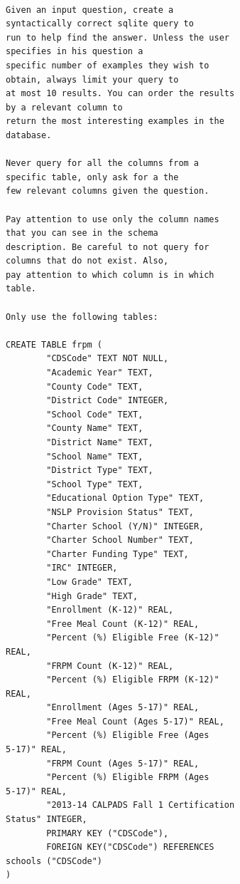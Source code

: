 \documentclass[
  letterpaper,
  DIV=11,
  numbers=noendperiod]{scrartcl}
\begin{document}
\begin{verbatim}

Given an input question, create a 
syntactically correct sqlite query to
run to help find the answer. Unless the user 
specifies in his question a
specific number of examples they wish to 
obtain, always limit your query to
at most 10 results. You can order the results
by a relevant column to
return the most interesting examples in the 
database.

Never query for all the columns from a 
specific table, only ask for a the
few relevant columns given the question.

Pay attention to use only the column names 
that you can see in the schema
description. Be careful to not query for 
columns that do not exist. Also,
pay attention to which column is in which 
table.

Only use the following tables:

CREATE TABLE frpm (
        "CDSCode" TEXT NOT NULL, 
        "Academic Year" TEXT, 
        "County Code" TEXT, 
        "District Code" INTEGER, 
        "School Code" TEXT, 
        "County Name" TEXT, 
        "District Name" TEXT, 
        "School Name" TEXT, 
        "District Type" TEXT, 
        "School Type" TEXT, 
        "Educational Option Type" TEXT, 
        "NSLP Provision Status" TEXT, 
        "Charter School (Y/N)" INTEGER, 
        "Charter School Number" TEXT, 
        "Charter Funding Type" TEXT, 
        "IRC" INTEGER, 
        "Low Grade" TEXT, 
        "High Grade" TEXT, 
        "Enrollment (K-12)" REAL, 
        "Free Meal Count (K-12)" REAL, 
        "Percent (%) Eligible Free (K-12)" 
REAL, 
        "FRPM Count (K-12)" REAL, 
        "Percent (%) Eligible FRPM (K-12)" 
REAL, 
        "Enrollment (Ages 5-17)" REAL, 
        "Free Meal Count (Ages 5-17)" REAL, 
        "Percent (%) Eligible Free (Ages 
5-17)" REAL, 
        "FRPM Count (Ages 5-17)" REAL, 
        "Percent (%) Eligible FRPM (Ages 
5-17)" REAL, 
        "2013-14 CALPADS Fall 1 Certification
Status" INTEGER, 
        PRIMARY KEY ("CDSCode"), 
        FOREIGN KEY("CDSCode") REFERENCES 
schools ("CDSCode")
)


\end{verbatim}
\end{document}
